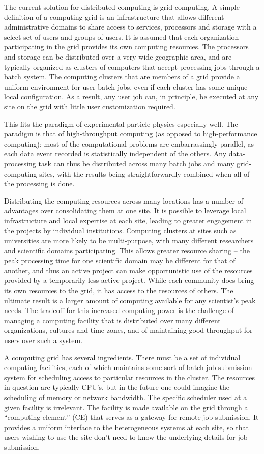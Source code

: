 The current solution for distributed computing is grid computing.  A simple definition of a computing grid is an infrastructure that allows different administrative domains to share access to services, processors and storage with a select set of users and groups of users.  It is assumed that each organization participating in the grid provides its own computing resources.  The processors and storage can be distributed over a very wide geographic area, and are typically organized as clusters of computers that accept processing jobs through a batch system.  The computing clusters that are members of a grid provide a uniform environment for user batch jobs, even if each cluster has some unique local configuration.  As a result, any user job can, in principle, be executed at any site on the grid with little user customization required.

This fits the paradigm of experimental particle physics especially well.  The paradigm is that of high-throughput computing (as opposed to high-performance computing); most of the computational problems are embarrassingly parallel, as each data event recorded is statistically independent of the others.  Any data-processing task can thus be distributed across many batch jobs and many grid-computing sites, with the results being straightforwardly combined when all of the processing is done.

Distributing the computing resources across many locations has a number of advantages over consolidating them at one site.  It is possible to leverage local infrastructure and local expertise at each site, leading to greater engagement in the projects by individual institutions.  Computing clusters at sites such as universities are more likely to be multi-purpose, with many different researchers and scientific domains participating.  This allows greater resource sharing -- the peak processing time for one scientific domain may be different for that of another, and thus an active project can make opportunistic use of the resources provided by a temporarily less active project.  While each community does bring its own resources to the grid, it has access to the resources of others.  The ultimate result is a larger amount of computing available for any scientist’s peak needs.  The tradeoff for this increased computing power is the challenge of managing a computing facility that is distributed over many different organizations, cultures and time zones, and of maintaining good throughput for users over such a system.

A computing grid has several ingredients.  There must be a set of individual computing facilities, each of which maintains some sort of batch-job submission system for scheduling access to particular resources in the cluster.  The resources in question are typically CPU’s, but in the future one could imagine the scheduling of memory or network bandwidth.  The specific scheduler used at a given facility is irrelevant.  The facility is made available on the grid through a “computing element” (CE) that serves as a gateway for remote job submission.  It provides a uniform interface to the heterogeneous systems at each site, so that users wishing to use the site don’t need to know the underlying details for job submission.

